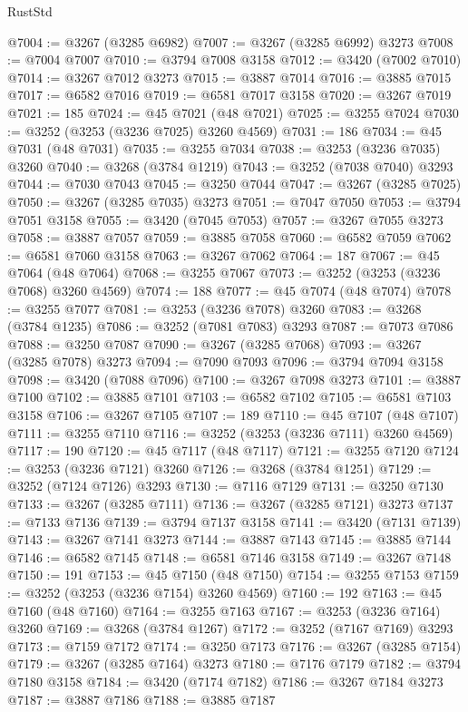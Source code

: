 \begin{lexlean}{RustStd}
\begin{coremodule}
@7004 := @3267 (@3285 @6982)
@7007 := @3267 (@3285 @6992) @3273
@7008 := @7004 @7007
@7010 := @3794 @7008 @3158
@7012 := @3420 (@7002 @7010)
@7014 := @3267 @7012 @3273
@7015 := @3887 @7014
@7016 := @3885 @7015
@7017 := @6582 @7016
@7019 := @6581 @7017 @3158
@7020 := @3267 @7019
@7021 := 185
@7024 := @45 @7021 (@48 @7021)
@7025 := @3255 @7024
@7030 := @3252 (@3253 (@3236 @7025) @3260 @4569)
@7031 := 186
@7034 := @45 @7031 (@48 @7031)
@7035 := @3255 @7034
@7038 := @3253 (@3236 @7035) @3260
@7040 := @3268 (@3784 @1219)
@7043 := @3252 (@7038 @7040) @3293
@7044 := @7030 @7043
@7045 := @3250 @7044
@7047 := @3267 (@3285 @7025)
@7050 := @3267 (@3285 @7035) @3273
@7051 := @7047 @7050
@7053 := @3794 @7051 @3158
@7055 := @3420 (@7045 @7053)
@7057 := @3267 @7055 @3273
@7058 := @3887 @7057
@7059 := @3885 @7058
@7060 := @6582 @7059
@7062 := @6581 @7060 @3158
@7063 := @3267 @7062
@7064 := 187
@7067 := @45 @7064 (@48 @7064)
@7068 := @3255 @7067
@7073 := @3252 (@3253 (@3236 @7068) @3260 @4569)
@7074 := 188
@7077 := @45 @7074 (@48 @7074)
@7078 := @3255 @7077
@7081 := @3253 (@3236 @7078) @3260
@7083 := @3268 (@3784 @1235)
@7086 := @3252 (@7081 @7083) @3293
@7087 := @7073 @7086
@7088 := @3250 @7087
@7090 := @3267 (@3285 @7068)
@7093 := @3267 (@3285 @7078) @3273
@7094 := @7090 @7093
@7096 := @3794 @7094 @3158
@7098 := @3420 (@7088 @7096)
@7100 := @3267 @7098 @3273
@7101 := @3887 @7100
@7102 := @3885 @7101
@7103 := @6582 @7102
@7105 := @6581 @7103 @3158
@7106 := @3267 @7105
@7107 := 189
@7110 := @45 @7107 (@48 @7107)
@7111 := @3255 @7110
@7116 := @3252 (@3253 (@3236 @7111) @3260 @4569)
@7117 := 190
@7120 := @45 @7117 (@48 @7117)
@7121 := @3255 @7120
@7124 := @3253 (@3236 @7121) @3260
@7126 := @3268 (@3784 @1251)
@7129 := @3252 (@7124 @7126) @3293
@7130 := @7116 @7129
@7131 := @3250 @7130
@7133 := @3267 (@3285 @7111)
@7136 := @3267 (@3285 @7121) @3273
@7137 := @7133 @7136
@7139 := @3794 @7137 @3158
@7141 := @3420 (@7131 @7139)
@7143 := @3267 @7141 @3273
@7144 := @3887 @7143
@7145 := @3885 @7144
@7146 := @6582 @7145
@7148 := @6581 @7146 @3158
@7149 := @3267 @7148
@7150 := 191
@7153 := @45 @7150 (@48 @7150)
@7154 := @3255 @7153
@7159 := @3252 (@3253 (@3236 @7154) @3260 @4569)
@7160 := 192
@7163 := @45 @7160 (@48 @7160)
@7164 := @3255 @7163
@7167 := @3253 (@3236 @7164) @3260
@7169 := @3268 (@3784 @1267)
@7172 := @3252 (@7167 @7169) @3293
@7173 := @7159 @7172
@7174 := @3250 @7173
@7176 := @3267 (@3285 @7154)
@7179 := @3267 (@3285 @7164) @3273
@7180 := @7176 @7179
@7182 := @3794 @7180 @3158
@7184 := @3420 (@7174 @7182)
@7186 := @3267 @7184 @3273
@7187 := @3887 @7186
@7188 := @3885 @7187

\end{coremodule}
\end{lexlean}
